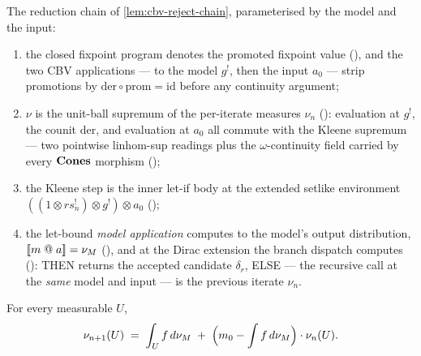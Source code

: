 \begin{lemma}%
\label{lem:cbv-reject-model-chain}
\rocqok
{}\rocqok
{}\rocqok
{}\rocqok
{}\rocqok
{}
The reduction chain of \autoref{lem:cbv-reject-chain},
parameterised by the model and the input:
\begin{enumerate}
  \item the closed fixpoint program denotes the promoted fixpoint
    value
    (), and
    the two CBV applications --- to the model $g^!$, then the input
    $a_0$ --- strip promotions by
    $\mathrm{der} \circ \mathrm{prom} = \mathrm{id}$ before any
    continuity argument;
  \item $\nu$ is the unit-ball supremum of the per-iterate measures
    $\nu_n$
    ():
    evaluation at $g^!$, the counit $\mathrm{der}$, and evaluation at
    $a_0$ all commute with the Kleene supremum --- two pointwise
    linhom-sup readings plus the $\omega$-continuity field carried by
    every $\mathbf{Cones}$ morphism
    ();
  \item the Kleene step is the inner let-if body at the extended
    setlike environment
    $((1 \otimes \textit{rs}_n^!) \otimes g^!) \otimes a_0$
    ();
  \item the let-bound \emph{model application} computes to the
    model's output distribution, $[\![ m\;@\;a ]\!] = \nu_M$
    (), and at
    the Dirac extension the branch dispatch computes
    ():
    THEN returns the accepted candidate $\delta_r$, ELSE --- the
    recursive call at the \emph{same} model and input --- is the
    previous iterate $\nu_n$.
\end{enumerate}
\end{lemma}

\begin{lemma}%
\label{lem:cbv-reject-model-recurrence}
\rocqok
{}\rocqok
{}
For every measurable $U$,
\[
  \nu_{n+1}(U)
  \;=\;
  \int_U f\,d\nu_M
  \;+\;
  \Bigl(m_0 - \int f\,d\nu_M\Bigr)\cdot \nu_n(U).
\]
\end{lemma}

